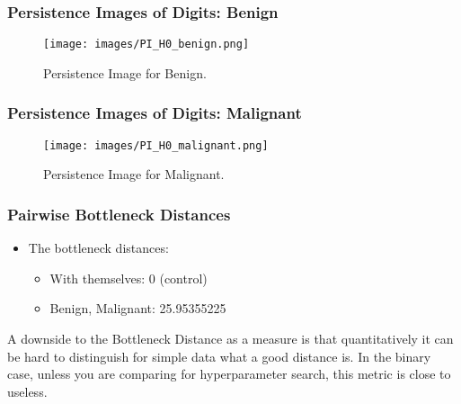 		
		\begin{frame}
		\frametitle{Persistence Images of Digits: Benign}
		
		\begin{figure}
				\centering
				\texttt{[image: images/PI\_H0\_benign.png]}
				\caption{Persistence Image for Benign.}
		\end{figure}
		\end{frame}

		\begin{frame}
		\frametitle{Persistence Images of Digits: Malignant}
		
		\begin{figure}
				\centering
				\texttt{[image: images/PI\_H0\_malignant.png]}
				\caption{Persistence Image for Malignant.}
		\end{figure}
		\end{frame}
		
		
		\begin{frame}
		\frametitle{Pairwise Bottleneck Distances}
		
		\begin{itemize}
			\item The bottleneck distances:
				\begin{itemize}
					\item With themselves: 0 (control)
					\item Benign, Malignant: 25.95355225
				\end{itemize}
		\end{itemize}
		
		A downside to the Bottleneck Distance as a measure is that quantitatively it can be hard to distinguish for simple data what a good distance is. In the binary case, unless you are comparing for hyperparameter search, this metric is close to useless.
		\end{frame}